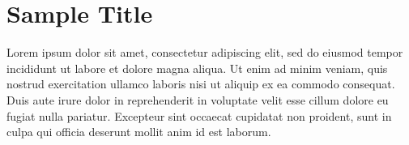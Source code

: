 \documentclass[../main.tex]{subfiles}
\begin{document}
 


\chapter{Sample Title}

Lorem ipsum dolor sit amet, consectetur adipiscing elit, sed do eiusmod tempor incididunt ut labore et dolore magna aliqua. Ut enim ad minim veniam, quis nostrud exercitation ullamco laboris nisi ut aliquip ex ea commodo consequat. Duis aute irure dolor in reprehenderit in voluptate velit esse cillum dolore eu fugiat nulla pariatur. Excepteur sint occaecat cupidatat non proident, sunt in culpa qui officia deserunt mollit anim id est laborum.
\end{document}
